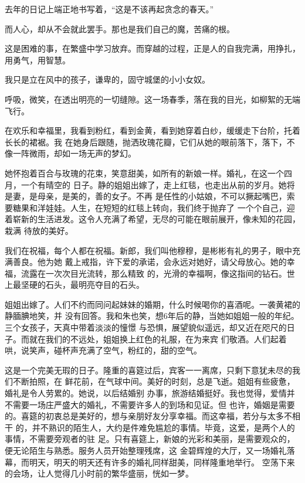 \documentclass[12pt,a4paper]{article}
\begin{document}
		去年的日记上端正地书写着，“这是不该再起贪念的春天。”

		而人心，却从不会就此罢手。那也是我们自己的魔，苦痛的根。

		这是困难的事，在繁盛中学习放弃。而穿越的过程，正是人的自我完满，用挣扎，用勇气，用智慧。


		我只是立在风中的孩子，谦卑的，固守城堡的小小女奴。

		呼吸，微笑，在透出明亮的一切缝隙。这一场春季，落在我的目光，如柳絮的无端飞行。

	\endwriting



		在欢乐和幸福里，我看到粉红，看到金黄，看到她穿着白纱，缓缓走下台阶，托着长长的裙裾。我
	在她身后跟随，抛洒玫瑰花瓣，它们从她的眼前落下，落下，不像一阵微雨，却如一场无声的梦幻。

		她怀抱着百合与玫瑰的花束，笑意甜美，如所有的新娘一样。婚礼，在这一个四月，一个有晴空的
	日子。静的姐姐出嫁了，走上红毯，也走出从前的岁月。她将是妻，是母亲，是美的，善的女子。不再
	是任性的小姑娘，不可以撅起嘴巴，索要糖果和洋娃娃。人生，在短短的红毯上转向，我们终于抛弃了
	一个个自己，迎着崭新的生活进发。这令人充满了希望，无尽的可能在眼前展开，像未知的花园，栽满
	待放的美好。

		我们在祝福，每个人都在祝福。新郎，我们叫他穆穆，是彬彬有礼的男子，眼中充满善良。他为她
	戴上戒指，许下爱的承诺，会永远对她好，请父母放心。她的幸福，流露在一次次目光流转，那么精致
	的，光滑的幸福啊，像这指间的钻石。世上最坚硬的石头，最明亮夺目的石头。

		姐姐出嫁了。人们不约而同问起妹妹的婚期，什么时候喝你的喜酒呢。一袭黄裙的静腼腆地笑，并
	没有回答。我和朱也笑，想6年后的静，当她如姐姐一般的年纪。三个女孩子，天真中带着淡淡的憧憬
	与恐惧，展望貌似遥远，却又近在咫尺的日子。而就在我们的不远处，姐姐换上红色的礼服，在为来宾
	们敬酒。人们起着哄，说笑声，碰杯声充满了空气，粉红的，甜的空气。

		这是一个完美无瑕的日子。隆重的喜筵过后，宾客一一离席，只剩下意犹未尽的我们不断拍照，在
	鲜花前，在气球中间。美好的时刻，总是飞逝。姐姐有些疲惫，婚礼是令人劳累的。她说，以后结婚别
	办事，旅游结婚挺好。我也觉得，爱情并不需要一场庄严盛大的婚礼，不需要许多人的到场和见证。但
	也许，婚姻是需要的。喜筵的初衷总是美好的，想与亲朋好友分享幸福。而这幸福，若分与太多不相干
	的，并不熟识的陌生人，大约是件难免尴尬的事情。毕竟，这爱，是两个人的事情，不需要旁观者的驻
	足。只有喜筵上，新娘的光彩和美丽，是需要观众的，便无论陌生与熟悉。服务人员开始整理残席，这
	金碧辉煌的大厅，又一场婚礼落幕，而明天，明天的明天还有许多的婚礼同样甜美，同样隆重地举行。
	空荡下来的会场，让人觉得几小时前的繁华盛丽，恍如一梦。
\end{document}
